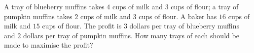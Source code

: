 A tray of blueberry muffins takes $4$ cups of milk and $3$ cups of flour; a tray of pumpkin muffins takes $2$ cups of milk and $3$ cups of flour. A baker has $16$ cups of milk and $15$ cups of flour. The profit is $3$ dollars per tray of blueberry muffins and $2$ dollars per tray of pumpkin muffins. How many trays of each should be made to maximise the profit?
